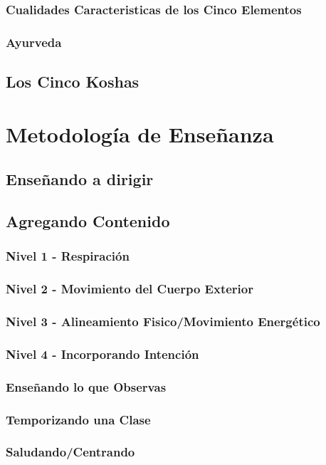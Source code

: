 \documentclass[11pt]{book}
\begin{document}
\subsection{Cualidades Caracteristicas de los Cinco Elementos}
\subsection{Ayurveda}
\section{Los Cinco Koshas}

\chapter{Metodología de Enseñanza}
\section{Enseñando a dirigir}
\section{Agregando Contenido}
\subsection{Nivel 1 - Respiración}
\subsection{Nivel 2 - Movimiento del Cuerpo Exterior}
\subsection{Nivel 3 - Alineamiento Fisico/Movimiento Energético}
\subsection{Nivel 4 - Incorporando Intención}
\subsection{Enseñando lo que Observas}
\subsection{Temporizando una Clase}
\subsection{Saludando/Centrando}
\end{document}
